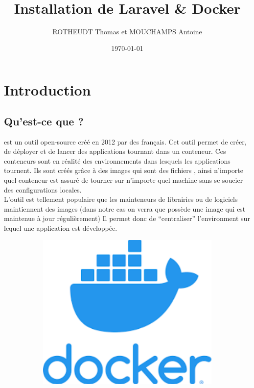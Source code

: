 \documentclass[internal]{nhitec_design}
\author{ROTHEUDT Thomas et MOUCHAMPS Antoine}
\date{\today}
\title{Installation de Laravel \& Docker}
\begin{document}
\maketitle
\newpage
{
\hypersetup{linkcolor=black}
\color{red_nhitec}
\tableofcontents
}

\newpage

\section[Introduction]{Introduction}
    \subsection[Qu'est-ce que Docker?]{Qu'est-ce que \docker{}?}
        
        \docker{} est un outil open-source créé en 2012 par des français. Cet outil permet de créer, de déployer et de lancer des applications tournant dans un conteneur. Ces conteneurs sont en réalité des environnements dans lesquels les applications tournent.
        Ils sont créés grâce à des images qui sont des fichiers \docker{}, ainsi n'importe quel conteneur est assuré de tourner sur n'importe quel machine sans se soucier des configurations locales.\\
        L'outil est tellement populaire que les mainteneurs de librairies ou de logiciels maintiennent des images \docker{} (dans notre cas on verra que \laravelsail{} possède une image \docker{} qui est maintenue à jour régulièrement)
        Il permet donc de ``centraliser'' l'environment sur lequel une application est développée. 

        \begin{figure}[h]
            \centering
            \begin{subfigure}[b]{0.3\textwidth}
                \includegraphics[scale=0.4]{Images_formation/LogoDocker.pdf}
            \end{subfigure}%
        \end{figure}
        
\end{document}
